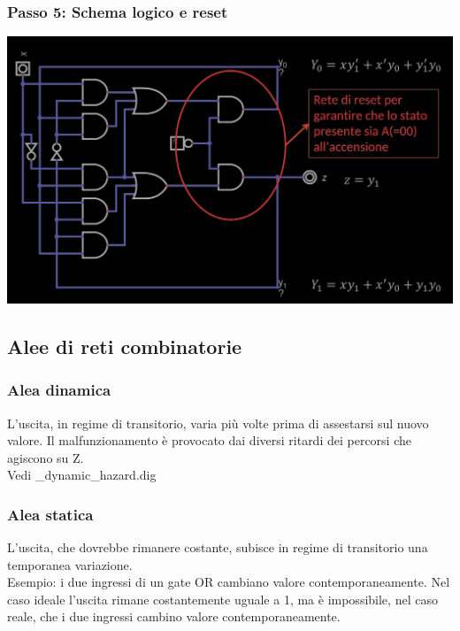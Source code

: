 \documentclass{article}
\begin{document}
\subsubsection*{Passo 5: Schema logico e reset}
\begin{center}
    \includegraphics[scale=0.5]{passo5.png}
\end{center}
\subsection{Alee di reti combinatorie}
\subsubsection{Alea dinamica}
L’uscita, in regime di transitorio, varia più volte prima di assestarsi sul nuovo valore. Il malfunzionamento è provocato dai diversi ritardi dei percorsi che agiscono su Z.\\
Vedi {\_dynamic\_hazard.dig}
\subsubsection{Alea statica}
L’uscita, che dovrebbe rimanere costante, subisce in regime di transitorio una temporanea variazione.\\
Esempio: i due ingressi di un gate OR cambiano valore contemporaneamente. Nel caso ideale l'uscita rimane costantemente uguale a 1, ma è impossibile, nel caso reale, che i due ingressi cambino valore contemporaneamente.\\
\end{document}
